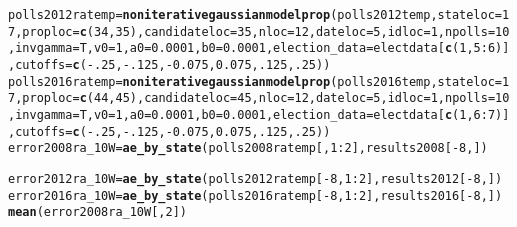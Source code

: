 \documentclass{article}\usepackage[]{graphicx}\usepackage[]{color}
\makeatletter
\newcommand{\hlnum}[1]{\textcolor[rgb]{0.686,0.059,0.569}{#1}}%
\newcommand{\hlopt}[1]{\textcolor[rgb]{0,0,0}{#1}}%
\newcommand{\hlstd}[1]{\textcolor[rgb]{0.345,0.345,0.345}{#1}}%
\newcommand{\hlkwb}[1]{\textcolor[rgb]{0.69,0.353,0.396}{#1}}%
\newcommand{\hlkwc}[1]{\textcolor[rgb]{0.333,0.667,0.333}{#1}}%
\newcommand{\hlkwd}[1]{\textcolor[rgb]{0.737,0.353,0.396}{\textbf{#1}}}%
\newenvironment{kframe}{%
 \def\at@end@of@kframe{}%
 \ifinner\ifhmode%
  \def\at@end@of@kframe{\end{minipage}}%
  \begin{minipage}{\columnwidth}%
 \fi\fi%
 \def\FrameCommand##1{\hskip\@totalleftmargin \hskip-\fboxsep
 \colorbox{shadecolor}{##1}\hskip-\fboxsep
     \hskip-\linewidth \hskip-\@totalleftmargin \hskip\columnwidth}%
 \MakeFramed {\advance\hsize-\width
   \@totalleftmargin\z@ \linewidth\hsize
   \@setminipage}}%
 {\par\unskip\endMakeFramed%
 \at@end@of@kframe}
\newenvironment{knitrout}{}{} %
\makeatother
\begin{document}
\begin{knitrout}
\begin{kframe}
\begin{alltt}
\hlstd{polls2012ratemp} \hlkwb{=} \hlkwd{noniterativegaussianmodelprop}\hlstd{(polls2012temp,} \hlkwc{stateloc} \hlstd{=} \hlnum{17}\hlstd{,} \hlkwc{proploc} \hlstd{=} \hlkwd{c}\hlstd{(}\hlnum{34}\hlstd{,} \hlnum{35}\hlstd{),} \hlkwc{candidateloc} \hlstd{=} \hlnum{35}\hlstd{,}  \hlkwc{nloc} \hlstd{=} \hlnum{12}\hlstd{,} \hlkwc{dateloc} \hlstd{=} \hlnum{5}\hlstd{,} \hlkwc{idloc} \hlstd{=} \hlnum{1}\hlstd{,}  \hlkwc{npolls} \hlstd{=} \hlnum{10}\hlstd{,}\hlkwc{invgamma} \hlstd{= T,} \hlkwc{v0}\hlstd{=}\hlnum{1}\hlstd{,} \hlkwc{a0}\hlstd{=}\hlnum{0.0001}\hlstd{,} \hlkwc{b0}\hlstd{=}\hlnum{0.0001}\hlstd{,}  \hlkwc{election_data} \hlstd{= electdata[}\hlkwd{c}\hlstd{(}\hlnum{1}\hlstd{,} \hlnum{5}\hlopt{:}\hlnum{6}\hlstd{)],} \hlkwc{cutoffs} \hlstd{=} \hlkwd{c}\hlstd{(}\hlopt{-}\hlnum{.25}\hlstd{,} \hlopt{-}\hlnum{.125}\hlstd{,} \hlopt{-}\hlnum{0.075}\hlstd{,} \hlnum{0.075}\hlstd{,} \hlnum{.125}\hlstd{,} \hlnum{.25}\hlstd{))}
\hlstd{polls2016ratemp} \hlkwb{=} \hlkwd{noniterativegaussianmodelprop}\hlstd{(polls2016temp,} \hlkwc{stateloc} \hlstd{=} \hlnum{17}\hlstd{,} \hlkwc{proploc} \hlstd{=} \hlkwd{c}\hlstd{(}\hlnum{44}\hlstd{,} \hlnum{45}\hlstd{),} \hlkwc{candidateloc} \hlstd{=} \hlnum{45}\hlstd{,} \hlkwc{nloc} \hlstd{=} \hlnum{12}\hlstd{,} \hlkwc{dateloc} \hlstd{=} \hlnum{5}\hlstd{,} \hlkwc{idloc} \hlstd{=} \hlnum{1}\hlstd{,}\hlkwc{npolls} \hlstd{=} \hlnum{10}\hlstd{,} \hlkwc{invgamma} \hlstd{= T,} \hlkwc{v0}\hlstd{=}\hlnum{1}\hlstd{,} \hlkwc{a0}\hlstd{=}\hlnum{0.0001}\hlstd{,} \hlkwc{b0}\hlstd{=}\hlnum{0.0001}\hlstd{,} \hlkwc{election_data} \hlstd{= electdata[}\hlkwd{c}\hlstd{(}\hlnum{1}\hlstd{,} \hlnum{6}\hlopt{:}\hlnum{7}\hlstd{)],} \hlkwc{cutoffs} \hlstd{=} \hlkwd{c}\hlstd{(}\hlopt{-}\hlnum{.25}\hlstd{,} \hlopt{-}\hlnum{.125}\hlstd{,} \hlopt{-}\hlnum{0.075}\hlstd{,} \hlnum{0.075}\hlstd{,} \hlnum{.125}\hlstd{,} \hlnum{.25}\hlstd{))}
\hlstd{error2008ra_10W} \hlkwb{=} \hlkwd{ae_by_state}\hlstd{(polls2008ratemp[,} \hlnum{1}\hlopt{:}\hlnum{2}\hlstd{], results2008[}\hlopt{-}\hlnum{8}\hlstd{, ])}
\end{alltt}


{\ttfamily\noindent\color{warningcolor}{\#\# Warning in ae\_by\_state(polls2008ratemp[, 1:2], results2008[-8, ]): Predicted names do not match names of actual data}}

{\ttfamily\noindent\bfseries\color{errorcolor}{\#\# Error in ae\_by\_state(polls2008ratemp[, 1:2], results2008[-8, ]): Incompatiable dimensions of predicted and actual}}\begin{alltt}
\hlstd{error2012ra_10W} \hlkwb{=} \hlkwd{ae_by_state}\hlstd{(polls2012ratemp[}\hlopt{-}\hlnum{8}\hlstd{,} \hlnum{1}\hlopt{:}\hlnum{2}\hlstd{], results2012[}\hlopt{-}\hlnum{8}\hlstd{, ])}
\hlstd{error2016ra_10W} \hlkwb{=} \hlkwd{ae_by_state}\hlstd{(polls2016ratemp[}\hlopt{-}\hlnum{8}\hlstd{,} \hlnum{1}\hlopt{:}\hlnum{2}\hlstd{], results2016[}\hlopt{-}\hlnum{8}\hlstd{, ])}
\hlkwd{mean}\hlstd{(error2008ra_10W[,}\hlnum{2}\hlstd{])}
\end{alltt}



\end{kframe}
\end{knitrout}
\end{document}
